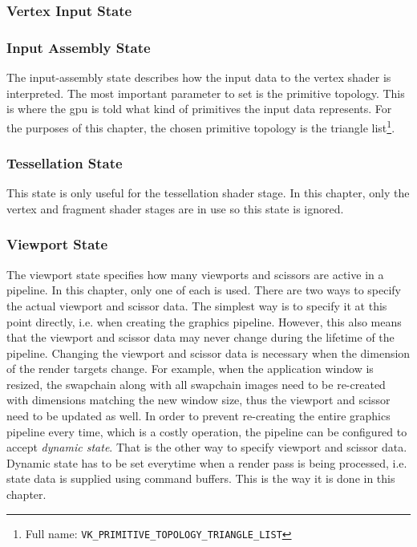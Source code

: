       \subsubsection{Vertex Input State}
        \tbd

      \subsubsection{Input Assembly State}
        The input-assembly state describes how the input data to the vertex shader is interpreted.
        The most important parameter to set is the primitive topology.
        This is where the \gls{gpu} is told what kind of primitives the input data represents.
        For the purposes of this chapter, the chosen primitive topology is the triangle list\footnote{Full name: \lstinline{VK_PRIMITIVE_TOPOLOGY_TRIANGLE_LIST}}.

      \subsubsection{Tessellation State}
        This state is only useful for the tessellation shader stage.
        In this chapter, only the vertex and fragment shader stages are in use so this state is ignored.

      \subsubsection{Viewport State}
        The viewport state specifies how many viewports and scissors are active in a pipeline.
        In this chapter, only one of each is used.
        There are two ways to specify the actual viewport and scissor data.
        The simplest way is to specify it at this point directly, i.e. when creating the graphics pipeline.
        However, this also means that the viewport and scissor data may never change during the lifetime of the pipeline.
        Changing the viewport and scissor data is necessary when the dimension of the render targets change.
        For example, when the application window is resized, the swapchain along with all swapchain images need to be re-created with dimensions matching the new window size, thus the viewport and scissor need to be updated as well.
        In order to prevent re-creating the entire graphics pipeline every time, which is a costly operation, the pipeline can be configured to accept \textit{dynamic state}.
        That is the other way to specify viewport and scissor data.
        Dynamic state has to be set everytime when a render pass is being processed, i.e. state data is supplied using command buffers.
        This is the way it is done in this chapter.

